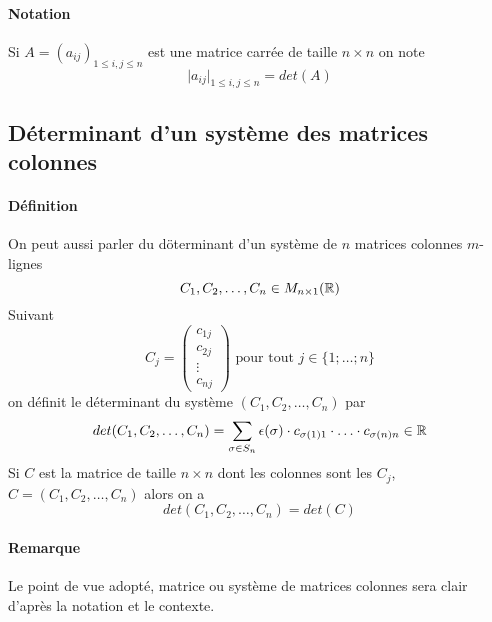 \paragraph{Notation} Si $A = (a_{ij})_{1 \leq i, j\leq n}$ est une matrice carrée de taille $n\times n$ on note
$$\vert a_{ij} \vert _{1 \leq i, j \leq n} = det(A)$$

%
\subsection{Déterminant d'un système des matrices colonnes}
%
\paragraph{Définition} On peut aussi parler du döterminant d'un système de $n$ matrices colonnes $m$-lignes
$$C_1, C_2, \ldots, C_n  \in M_{n\times 1}(\mathbb{R})$$
Suivant
$$C_{j} = \begin{pmatrix} c_{1j} \\ c_{2j} \\ \vdots \\ c_{nj} \end{pmatrix} \text{ pour tout } j \in \{1; \ldots ; n\}$$
on définit le déterminant du système $(C_1, C_2, \ldots, C_n)$ par
$$det(C_1, C_2, \ldots, C_n) = \sum_{\sigma \in S_n} \epsilon(\sigma) \cdot c_{\sigma(1) 1} \cdot \ldots \cdot c_{\sigma(n) n} \in \mathbb{R}$$
Si $C$ est la matrice de taille $n \times n$ dont les colonnes sont les $C_j$, $C = (C_1, C_2, \ldots, C_n)$ alors on a
$$det(C_1, C_2, \ldots, C_n) = det(C)$$
\paragraph{Remarque} Le point de vue adopté, matrice ou système de matrices colonnes sera clair d'après la notation et le contexte.


